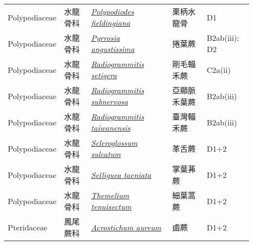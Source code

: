{\begin{longtable}{L{2.5cm}L{2cm}L{5cm}L{2.5cm}L{3cm}}
    Polypodiaceae & 水龍骨科 & \href{http://www.theplantlist.org/tpl1.1/search?q=Polypodiodes+fieldingiana}{\textit{Polypodiodes fieldingiana} } & 栗柄水龍骨 & D1    \\
    Polypodiaceae & 水龍骨科 & \href{http://www.theplantlist.org/tpl1.1/search?q=Pyrrosia+angustissima}{\textit{Pyrrosia angustissima} } & 捲葉蕨 & B2ab(iii); D2    \\
    Polypodiaceae & 水龍骨科 & \href{http://www.theplantlist.org/tpl1.1/search?q=Radiogrammitis+setigera}{\textit{Radiogrammitis setigera} } & 剛毛輻禾蕨 & C2a(ii)    \\
    Polypodiaceae & 水龍骨科 & \href{http://www.theplantlist.org/tpl1.1/search?q=Radiogrammitis+subnervosa}{\textit{Radiogrammitis subnervosa} } & 亞顯脈禾葉蕨 & B2ab(iii)    \\
    Polypodiaceae & 水龍骨科 & \href{http://www.theplantlist.org/tpl1.1/search?q=Radiogrammitis+taiwanensis}{\textit{Radiogrammitis taiwanensis} } & 臺灣輻禾蕨 & B2ab(iii)    \\
    Polypodiaceae & 水龍骨科 & \href{http://www.theplantlist.org/tpl1.1/search?q=Scleroglossum+sulcatum}{\textit{Scleroglossum sulcatum} } & 革舌蕨 & D1+2    \\
    Polypodiaceae & 水龍骨科 & \href{http://www.theplantlist.org/tpl1.1/search?q=Selliguea+taeniata}{\textit{Selliguea taeniata} } & 掌葉茀蕨 & D1+2    \\
    Polypodiaceae & 水龍骨科 & \href{http://www.theplantlist.org/tpl1.1/search?q=Themelium+tenuisectum}{\textit{Themelium tenuisectum} } & 細葉蒿蕨 & D1+2    \\
    Pteridaceae & 鳳尾蕨科 & \href{http://www.theplantlist.org/tpl1.1/search?q=Acrostichum+aureum}{\textit{Acrostichum aureum} } & 鹵蕨 & D1+2    \\

\end{longtable}}
